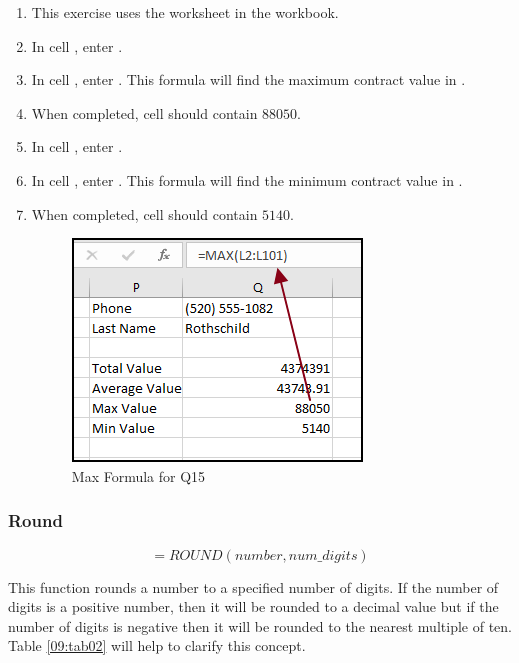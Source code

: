 \begin{enumerate}
	\item This exercise uses the  worksheet in the  workbook.
	\item In cell , enter .
	\item In cell , enter . This formula will find the maximum contract value in .
	\item When completed, cell  should contain $ 88050 $.
	\item In cell , enter .
	\item In cell , enter . This formula will find the minimum contract value in .
	\item When completed, cell  should contain $ 5140 $.

	\begin{figure}[H]
		\centering
		\includegraphics[width=\maxwidth{.75\linewidth}]{gfx/ch09_fig40}
		\caption{Max Formula for Q15}
		\label{09:fig40}
	\end{figure}

\end{enumerate}

\subsubsection{Round}

\[ =ROUND(number, num\_digits) \]

This function rounds a number to a specified number of digits. If the number of digits is a positive number, then it will be rounded to a decimal value but if the number of digits is negative then it will be rounded to the nearest multiple of ten. Table \ref{09:tab02} will help to clarify this concept.

